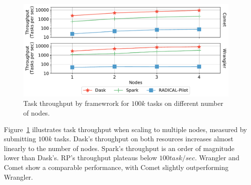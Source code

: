 \begin{figure}[t]
    \centering
    \includegraphics[width=.75\textwidth]{figures/data_analytics_hpc/task_par/daskVSsparkVSRpThroughput.pdf}
    \caption{Task throughput by framewrork for $100k$ tasks on different number of nodes.}
    \label{fig:RP_Dask_Spark_throughput}
\end{figure}

Figure~\ref{fig:RP_Dask_Spark_throughput} illustrates task throughput when
scaling to multiple nodes, measured by submitting $100k$ tasks. Dask's
throughput on both resources increases almost linearly to the number of nodes.
Spark's throughput is an order of magnitude lower than Dask's. RP's
throughput plateaus below $100 task/sec$. Wrangler and Comet show a comparable
performance, with Comet slightly outperforming Wrangler.



